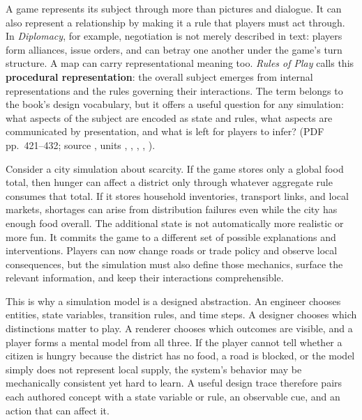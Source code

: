 A game represents its subject through more than pictures and dialogue. It can also represent a relationship by making it a rule that players must act through. In \emph{Diplomacy}, for example, negotiation is not merely described in text: players form alliances, issue orders, and can betray one another under the game's turn structure. A map can carry representational meaning too. \emph{Rules of Play} calls this \textbf{procedural representation}: the overall subject emerges from internal representations and the rules governing their interactions. The term belongs to the book's design vocabulary, but it offers a useful question for any simulation: what aspects of the subject are encoded as state and rules, what aspects are communicated by presentation, and what is left for players to infer? (PDF pp.~421--432; source , units , , , , ).

Consider a city simulation about scarcity. If the game stores only a global food total, then hunger can affect a district only through whatever aggregate rule consumes that total. If it stores household inventories, transport links, and local markets, shortages can arise from distribution failures even while the city has enough food overall. The additional state is not automatically more realistic or more fun. It commits the game to a different set of possible explanations and interventions. Players can now change roads or trade policy and observe local consequences, but the simulation must also define those mechanics, surface the relevant information, and keep their interactions comprehensible.

This is why a simulation model is a designed abstraction. An engineer chooses entities, state variables, transition rules, and time steps. A designer chooses which distinctions matter to play. A renderer chooses which outcomes are visible, and a player forms a mental model from all three. If the player cannot tell whether a citizen is hungry because the district has no food, a road is blocked, or the model simply does not represent local supply, the system's behavior may be mechanically consistent yet hard to learn. A useful design trace therefore pairs each authored concept with a state variable or rule, an observable cue, and an action that can affect it.

